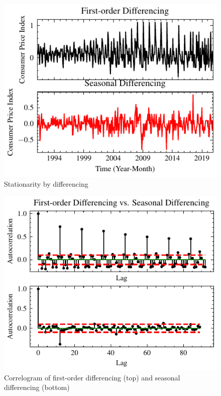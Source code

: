 \documentclass[conference]{IEEEtran}
\begin{document}
\begin{figure}
    \centering
    \includegraphics{../figs/differencing.pdf}
    \caption{Stationarity by differencing}
    \label{fig:differencing}
\end{figure}

\begin{figure}
    \centering
    \includegraphics{../figs/acs_diff.pdf}
    \caption{Correlogram of first-order differencing (top) and seasonal differencing (bottom)}
    \label{fig:acs_diff}
\end{figure}
\end{document}

